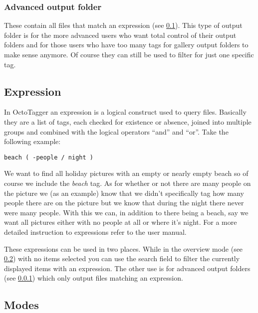 \subsubsection{Advanced output folder}%
\label{theory:advanced_output_folder}

These contain all files that match an expression (see
\cref{subsec:theory:expression}). This type of output folder is for the more
advanced users who want total control of their output folders and for those
users who have too many tags for gallery output folders to make sense anymore.
Of course they can still be used to filter for just one specific tag.

\subsection{Expression}%
\label{subsec:theory:expression}

In OctoTagger an expression is a logical construct used to query files.
Basically they are a list of tags, each checked for existence or absence,
joined into multiple groups and combined with the logical operators ``and'' and
``or''. Take the following example:

\begin{verbatim}
beach ( -people / night )
\end{verbatim}

We want to find all holiday pictures with an empty or nearly empty beach so of
course we include the \emph{beach} tag. As for whether or not there are many
people on the picture we (as an example) know that we didn't specifically tag
how many people there are on the picture but we know that during the night
there never were many people. With this we can, in addition to there being a
beach, say we want all pictures either with no people at all or where it's
night. For a more detailed instruction to expressions refer to the user manual.

These expressions can be used in two places. While in the overview mode (see
\cref{subsec:theory:modes}) with no items selected you can use the search field
to filter the currently displayed items with an expression. The other use is
for advanced output folders (see
\cref{theory:advanced_output_folder}) which only output files
matching an expression.

\subsection{Modes}%
\label{subsec:theory:modes}

